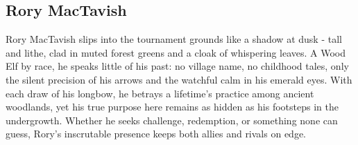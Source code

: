 \subsection{Rory MacTavish}\label{char:RoryMacTavish}
{\entryfont Rory MacTavish slips into the tournament grounds like a shadow at dusk - tall and lithe, clad in muted forest greens and a cloak of whispering leaves. A Wood Elf by race, he speaks little of his past: no village name, no childhood tales, only the silent precision of his arrows and the watchful calm in his emerald eyes. With each draw of his longbow, he betrays a lifetime's practice among ancient woodlands, yet his true purpose here remains as hidden as his footsteps in the undergrowth. Whether he seeks challenge, redemption, or something none can guess, Rory's inscrutable presence keeps both allies and rivals on edge.}
